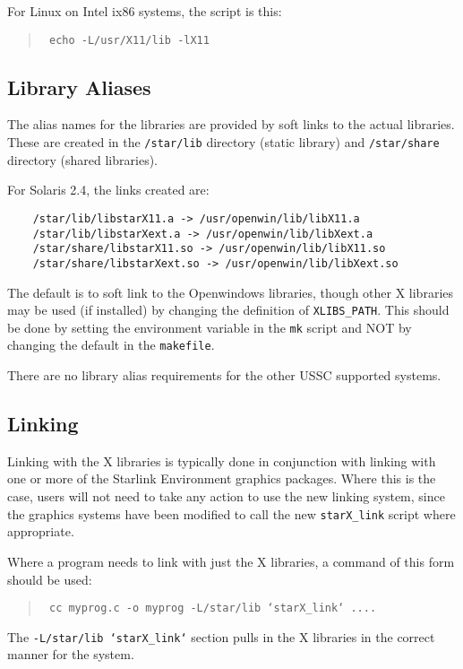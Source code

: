 For Linux on Intel ix86 systems, the script is this:

\begin{quote}{\tt
echo -L/usr/X11/lib -lX11}
\end{quote}

\subsection{Library Aliases}

The alias names for the libraries are provided by soft links to the
actual libraries.  These are created in the {\tt /star/lib} directory
(static library) and {\tt /star/share} directory (shared libraries).

For Solaris 2.4, the links created are:

\begin{verbatim}
    /star/lib/libstarX11.a -> /usr/openwin/lib/libX11.a
    /star/lib/libstarXext.a -> /usr/openwin/lib/libXext.a
    /star/share/libstarX11.so -> /usr/openwin/lib/libX11.so
    /star/share/libstarXext.so -> /usr/openwin/lib/libXext.so
\end{verbatim}

The default is to soft link to the Openwindows libraries, though other X
libraries may be used (if installed) by changing the definition of
{\tt XLIBS\_PATH}.  This should be done by setting the environment variable
in the {\tt mk} script and NOT by changing the default in the {\tt makefile}.

There are no library alias requirements for the other USSC supported systems.

\subsection{Linking}

Linking with the X libraries is typically done in conjunction with linking
with one or more of the Starlink Environment graphics packages.  Where this
is the case, users will not need to take any action to use the new
linking system, since the graphics systems have been modified to call
the new {\tt starX\_link} script where appropriate.

Where a program needs to link with just the X libraries, a command of
this form should be used:

\begin{quote}{\tt
cc myprog.c -o myprog -L/star/lib `starX\_link` ....}
\end{quote}

The {\tt -L/star/lib `starX\_link`} section pulls in the X libraries in
the correct manner for the system.


